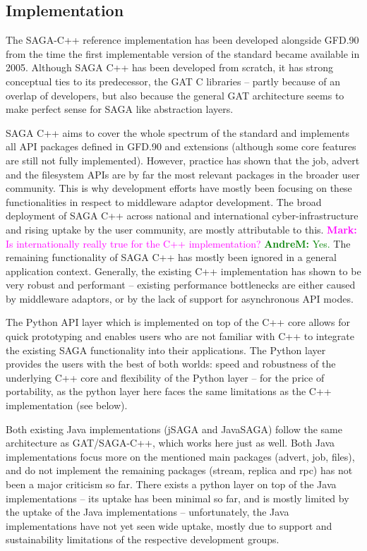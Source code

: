\documentclass[]{article}
\newcommand{\B}[1]{\textbf{#1}}
\newcommand{\amnote}[1]{{\textcolor{green}{   \B{AndreM:  } #1 }}}
\newcommand{\msnote}[1]{{\textcolor{magenta}{ \B{Mark:    } #1 }}}
\newcommand{\amnote}[1]{}
\newcommand{\msnote}[1]{}
\begin{document}
\subsection{Implementation}

  The SAGA-C++ reference implementation has been developed alongside
  GFD.90 from the time the first implementable version of the standard
  became available in 2005. Although SAGA C++ has been developed from
  scratch, it has strong conceptual ties to its predecessor, the GAT
  C libraries -- partly because of an overlap of developers, but also
  because the general GAT architecture seems to make perfect sense for
  SAGA like abstraction layers.

  SAGA C++ aims to cover the whole spectrum of the standard and
  implements all API packages defined in GFD.90 and extensions
  (although some core features are still not fully implemented).
  However, practice has shown that the job, advert and the filesystem
  APIs are by far the most relevant packages in the broader user
  community.  This is why development efforts have mostly been
  focusing on these functionalities in respect to middleware adaptor
  development.  The broad deployment of SAGA C++ across national and
  international cyber-infrastructure and rising uptake by the user
  community, are mostly attributable to this. \msnote{Is internationally
  really true for the C++ implementation?}\amnote{Yes.} The remaining
  functionality of SAGA C++ has mostly been ignored in a general
  application context.  Generally, the existing C++ implementation has
  shown to be very robust and performant -- existing performance
  bottlenecks are either caused by middleware adaptors, or by the lack
  of support for asynchronous API modes.  
  
  The Python API layer which is implemented on top of the C++ core
  allows for quick prototyping and enables users who are not familiar
  with C++ to integrate the existing SAGA functionality into their
  applications.  The Python layer provides the users with the best of
  both worlds: speed and robustness of the underlying C++ core and
  flexibility of the Python layer -- for the price of portability, as
  the python layer here faces the same limitations as the C++
  implementation (see below).

  Both existing Java implementations (jSAGA and JavaSAGA) follow the
  same architecture as GAT/SAGA-C++, which works here just as well.
  Both Java implementations focus more on the mentioned main packages
  (advert, job, files), and do not implement the remaining packages
  (stream, replica and rpc) has not been a major criticism so far.
  There exists a python layer on top of the Java implementations --
  its uptake has been minimal so far, and is mostly limited by the
  uptake of the Java implementations -- unfortunately, the Java
  implementations have not yet seen wide uptake, mostly due to support
  and sustainability limitations of the respective development groups.
  
\end{document}
